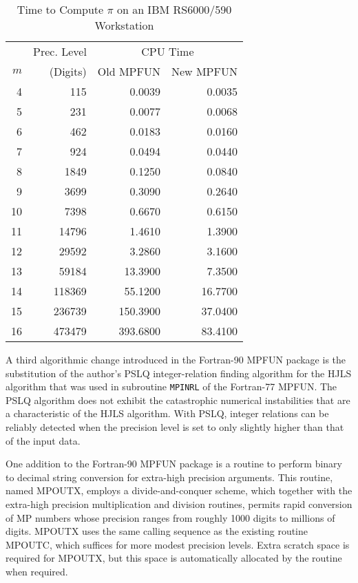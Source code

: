 \begin{table} \begin{center} \begin{tabular}{|r|r|r|r|}
\hline
    & Prec. Level &  \multicolumn{2}{|c|}{CPU Time} \\
$m$ &  (Digits)   & Old MPFUN & New MPFUN \\
\hline
 4  &    115 &    0.0039 &    0.0035 \\
 5  &    231 &    0.0077 &    0.0068 \\
 6  &    462 &    0.0183 &    0.0160 \\
 7  &    924 &    0.0494 &    0.0440 \\
 8  &   1849 &    0.1250 &    0.0840 \\
 9  &   3699 &    0.3090 &    0.2640 \\
10  &   7398 &    0.6670 &    0.6150 \\
11  &  14796 &    1.4610 &    1.3900 \\
12  &  29592 &    3.2860 &    3.1600 \\
13  &  59184 &   13.3900 &    7.3500 \\
14  & 118369 &   55.1200 &   16.7700 \\
15  & 236739 &  150.3900 &   37.0400 \\
16  & 473479 &  393.6800 &   83.4100 \\
\hline
\end{tabular}
\caption{Time to Compute $\pi$ on an IBM RS6000/590 Workstation}
\end{center} \end{table}

A third algorithmic change introduced in the Fortran-90 MPFUN package
is the substitution of the author's PSLQ integer-relation finding
algorithm \cite{dhb-pslq,dhb-eulsum} for the HJLS algorithm
\cite{hjls} that was used in subroutine {\tt MPINRL} of the Fortran-77
MPFUN.  The PSLQ algorithm does not exhibit the catastrophic numerical
instabilities that are a characteristic of the HJLS algorithm.  With
PSLQ, integer relations can be reliably detected when the precision
level is set to only slightly higher than that of the input data.

One addition to the Fortran-90 MPFUN package is a routine to perform
binary to decimal string conversion for extra-high precision
arguments.  This routine, named MPOUTX, employs a divide-and-conquer
scheme, which together with the extra-high precision multiplication
and division routines, permits rapid conversion of MP numbers whose
precision ranges from roughly 1000 digits to millions of digits.
MPOUTX uses the same calling sequence as the existing routine MPOUTC,
which suffices for more modest precision levels.  Extra scratch space
is required for MPOUTX, but this space is automatically allocated by
the routine when required.

